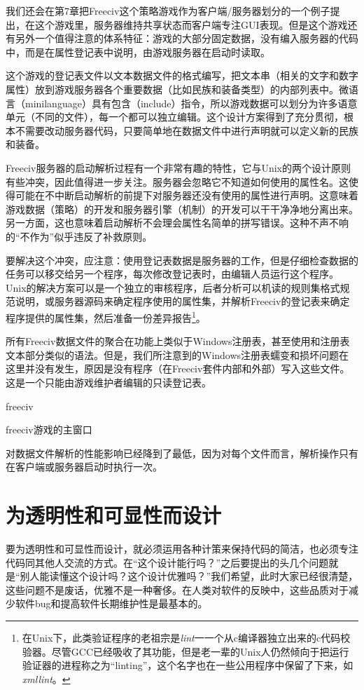 \documentclass[12pt,oneside]{book}
\begin{document}
\begin{common-format}
我们还会在第7章把Freeciv这个策略游戏作为客户端/服务器划分的一个例子提出，在这个游戏里，服务器维持共享状态而客户端专注GUI表现。但是这个游戏还有另外一个值得注意的体系特征：游戏的大部分固定数据，没有编入服务器的代码中，而是在属性登记表中说明，由游戏服务器在启动时读取。

这个游戏的登记表文件以文本数据文件的格式编写，把文本串（相关的文字和数字属性）放到游戏服务器各个重要数据（比如民族和装备类型）的内部列表中。微语言（minilanguage）具有包含（include）指令，所以游戏数据可以划分为许多语意单元（不同的文件），每一个都可以独立编辑。这个设计方案得到了充分贯彻，根本不需要改动服务器代码，只要简单地在数据文件中进行声明就可以定义新的民族和装备。

Freeciv服务器的启动解析过程有一个非常有趣的特性，它与Unix的两个设计原则有些冲突，因此值得进一步关注。服务器会忽略它不知道如何使用的属性名。这使得可能在不中断启动解析的前提下对服务器还没有使用的属性进行声明。这意味着游戏数据（策略）的开发和服务器引擎（机制）的开发可以干干净净地分离出来。另一方面，这也意味着启动解析不会理会属性名简单的拼写错误。这种不声不响的“不作为”似乎违反了补救原则。

要解决这个冲突，应注意：使用登记表数据是服务器的工作，但是仔细检查数据的任务可以移交给另一个程序，每次修改登记表时，由编辑人员运行这个程序。Unix的解决方案可以是一个独立的审核程序，后者分析可以机读的规则集格式规范说明，或服务器源码来确定程序使用的属性集，并解析Freeciv的登记表来确定程序提供的属性集，然后准备一份差异报告\footnote{在Unix下，此类验证程序的老祖宗是\textit{lint}一一个从c编译器独立出来的c代码校验器。尽管GCC已经吸收了其功能，但是老一辈的Unix人仍然倾向于把运行验证器的进程称之为“linting”，这个名字也在一些公用程序中保留了下来，如\textit{xmllint}。}。

所有Freeciv数据文件的聚合在功能上类似于Windows注册表，甚至使用和注册表文本部分类似的语法。但是，我们所注意到的Windows注册表蠕变和损坏问题在这里并没有发生，原因是没有程序（在Freeciv套件内部和外部）写入这些文件。这是一个只能由游戏维护者编辑的只读登记表。

\begin{linefig}{freeciv}
\caption{freeciv游戏的主窗口}
\label{fig:freeciv}
\end{linefig}

对数据文件解析的性能影响已经降到了最低，因为对每个文件而言，解析操作只有在客户端或服务器启动时执行一次。



\section{为透明性和可显性而设计}
要为透明性和可显性而设计，就必须运用各种计策来保持代码的简洁，也必须专注代码同其他人交流的方式。在“这个设计能行吗？”之后要提出的头几个问题就是“别人能读懂这个设计吗？这个设计优雅吗？”我们希望，此时大家已经很清楚，这些问题不是废话，优雅不是一种奢侈。在人类对软件的反映中，这些品质对于减少软件bug和提高软件长期维护性是最基本的。


\end{common-format}
\end{document}

